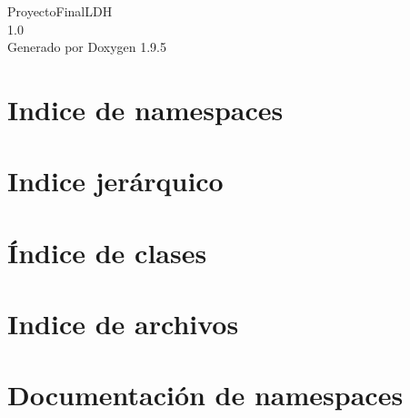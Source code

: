 \documentclass[twoside]{book}
\newcommand{\+}{\discretionary{\mbox{\scriptsize$\hookleftarrow$}}{}{}}
\newcommand{\clearemptydoublepage}{%
    \newpage{\pagestyle{empty}\cleardoublepage}%
  }
\begin{document}
  \raggedbottom
    \hypersetup{pageanchor=false,
                bookmarksnumbered=true,
                pdfencoding=unicode
               }
  \begin{titlepage}
  \vspace*{7cm}
  \begin{center}%
  {\Large Proyecto\+Final\+LDH}\\
  [1ex]\large 1.\+0 \\
  \vspace*{1cm}
  {\large Generado por Doxygen 1.9.5}\\
  \end{center}
  \end{titlepage}
  \clearemptydoublepage
  \tableofcontents
  \clearemptydoublepage
  \hypersetup{pageanchor=true}
\chapter{Indice de namespaces}

\chapter{Indice jerárquico}

\chapter{Índice de clases}

\chapter{Indice de archivos}

\chapter{Documentación de namespaces}






\end{document}
